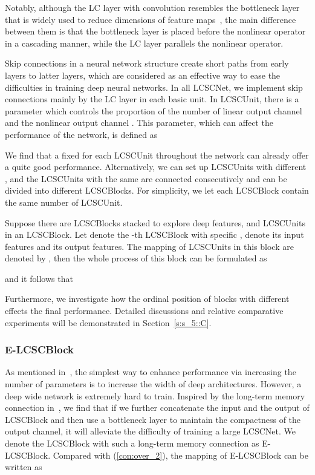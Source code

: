 \documentclass[journal]{IEEEtran}
\begin{document}
Notably, although the LC layer with  convolution resembles the bottleneck layer that is widely used to reduce dimensions of feature maps~\cite{lin2013network,huang2017densely}, the main difference between them is that the bottleneck layer is placed before the nonlinear operator in a cascading manner, while the LC layer parallels the nonlinear operator.

Skip connections in a neural network structure create short paths from early layers to latter layers, which are considered as an effective way to ease the difficulties in training deep neural networks. In all LCSCNet, we implement skip connections mainly by the LC layer in each basic unit. In LCSCUnit, there is a parameter which controls the proportion of the number of linear output channel  and the nonlinear output channel . This parameter, which can affect the performance of the network, is defined as

We find that a fixed  for each LCSCUnit throughout the network can already offer a quite good performance. Alternatively, we can set up LCSCUnits with different , and the LCSCUnits with the same  are connected consecutively and can be divided into different LCSCBlocks. For simplicity, we let each LCSCBlock contain the same number of LCSCUnit.

 

Suppose there are  LCSCBlocks stacked to explore deep features, and  LCSCUnits in an LCSCBlock. Let  denote the -th LCSCBlock with specific ,  denote its input features and  its output features. The mapping of LCSCUnits in this block are denoted by , then the whole process of this block can be formulated as 

and it follows that


Furthermore, we investigate how the ordinal position of blocks with different  effects the final performance. Detailed discussions and relative comparative experiments will be demonstrated in Section~\ref{s:s_5::C}.


\subsubsection{E-LCSCBlock}

As mentioned in~\cite{lim2017enhanced}, the simplest way to enhance performance via increasing the number of parameters is to increase the width of deep architectures. However, a deep wide network is extremely hard to train. 
Inspired by the long-term memory connection in~\cite{Tai-MemNet-2017}, we find that if we further concatenate the input and the output of LCSCBlock and then use a  bottleneck layer to maintain the compactness of the output channel, it will alleviate the difficulty of training a large LCSCNet. We denote the LCSCBlock with such a long-term memory connection as E-LCSCBlock. Compared with (\ref{con:over_2}), the mapping of E-LCSCBlock can be written as 
\end{document}

